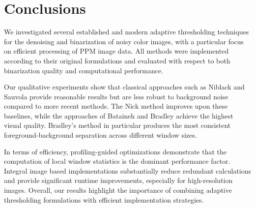 \section{Conclusions}\label{sec:conclusion}

We investigated several established and modern adaptive thresholding techniques for the denoising and binarization of noisy color images, with a particular focus on efficient processing of PPM image data.
All methods were implemented according to their original formulations and evaluated with respect to both binarization quality and computational performance.

Our qualitative experiments show that classical approaches such as Niblack and Sauvola provide reasonable results but are less robust to background noise compared to more recent methods.
The Nick method improves upon these baselines, while the approaches of Bataineh and Bradley achieve the highest visual quality.
Bradley's method in particular produces the most consistent foreground-background separation across different window sizes.

In terms of efficiency, profiling-guided optimizations demonstrate that the computation of local window statistics is the dominant performance factor.
Integral image based implementations substantially reduce redundant calculations and provide significant runtime improvements, especially for high-resolution images.
Overall, our results highlight the importance of combining adaptive thresholding formulations with efficient implementation strategies.
